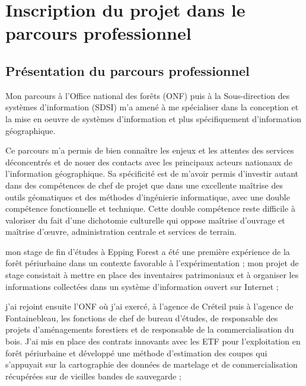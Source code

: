 \section
{Inscription du projet dans le parcours professionnel}

\subsection
{Présentation du parcours professionnel}

Mon parcours à l'Office national des forêts (ONF)
puis à la Sous-direction des systèmes d'information (SDSI)
m'a amené à me spécialiser dans la conception et la mise en oeuvre
de systèmes d'information et plus spécifiquement d'information géographique.

Ce parcours m'a permis de bien connaître les enjeux et les attentes
des services déconcentrés et de nouer des contacts avec les principaux
acteurs nationaux de l'information géographique.
Sa spécificité est de m'avoir permis d'investir autant dans
des compétences de chef de projet que dans une excellente maîtrise
des outils géomatiques et des méthodes d'ingénierie informatique,
avec une double compétence fonctionnelle
et technique.
Cette double compétence reste difficile à valoriser du fait d'une dichotomie
culturelle qui oppose maîtrise d'ouvrage et maîtrise d’œuvre,
administration centrale et services de terrain.

\startitemize[n]

\item mon stage de fin d'études à Epping Forest
      a été une première expérience de la forêt
      périurbaine dans un contexte favorable à l'expérimentation ;
      mon projet de stage consistait à mettre en place des inventaires patrimoniaux
      et à organiser les informations collectées dans un système d'information
      ouvert sur Internet ;

\item j'ai rejoint ensuite l'ONF
      où j'ai exercé, à l'agence de Créteil puis à l'agence de Fontainebleau,
      les fonctions de chef de bureau d'études, de responsable
      des projets d'aménagements forestiers et de responsable
      de la commercialisation du bois. J'ai mis en place
      des contrats innovants avec les ETF pour l'exploitation
      en forêt périurbaine et développé une méthode d'estimation
      des coupes qui s'appuyait sur la cartographie
      des données de martelage et de commercialisation
      récupérées sur de vieilles bandes de sauvegarde ;

